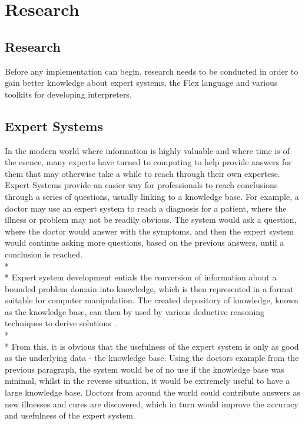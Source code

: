 \documentclass[12pt]{report}
\begin{document}
\chapter{Research}
\section[Research]{Research}\label{sec:intro_to_research}
Before any implementation can begin, research needs to be conducted in order to gain better knowledge about expert systems, the Flex language and various toolkits for developing interpreters.

\section{Expert Systems}\label{sec:expert_systems}
In the modern world where information is highly valuable and where time is of the esence, many experts have turned to computing to help provide answers for them that may otherwise take a while to reach through their own expertese.  Expert Systems provide an easier way for professionals to reach conclusions through a series of questions, usually linking to a knowledge base.  For example, a doctor may use an expert system to reach a diagnosis for a patient, where the illness or problem may not be readily obvious.  The system would ask a question, where the doctor would answer with the symptoms, and then the expert system would continue asking more questions, based on the previous answers, until a conclusion is reached.
\\*
\\*
Expert system development entials the conversion of information about a bounded problem domain into knowledge, which is then represented in a format suitable for computer manipulation.  The created depository of knowledge, known as the knowledge base, can then by used by various deductive reasoning techniques to derive solutions \citep{expertsystems98}.
\\*
\\*
From this, it is obvious that the usefulness of the expert system is only as good as the underlying data - the knowledge base.  Using the doctors example from the previous paragraph, the system would be of no use if the knowledge base was minimal, whilst in the reverse situation, it would be extremely useful to have a large knowledge base.  Doctors from around the world could contribute answers as new illnesses and cures are discovered, which in turn would improve the accuracy and usefulness of the expert system.
\end{document}
